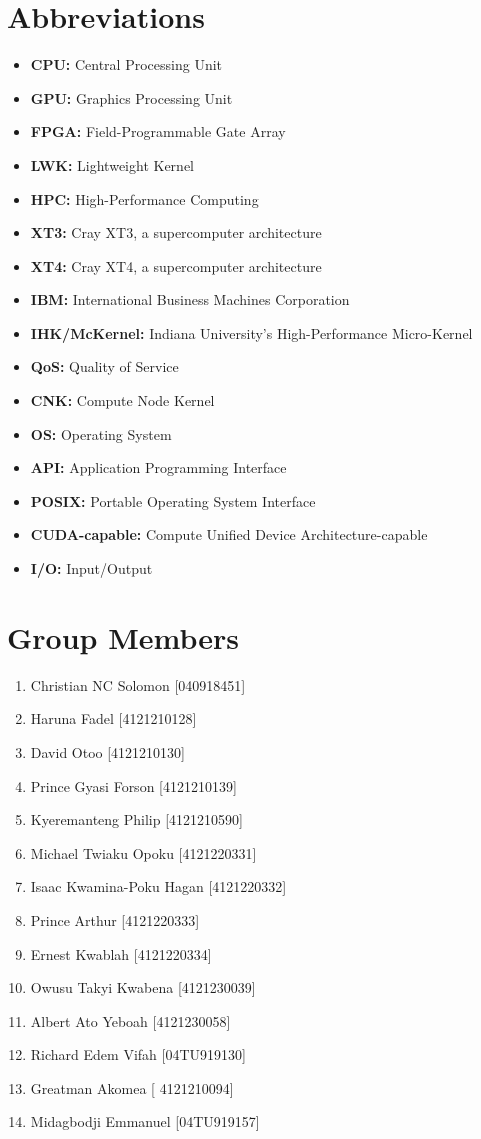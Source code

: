 \documentclass[16pt,a4paper]{article}
\begin{document}
\section*{Abbreviations}
\begin{itemize}
\item \textbf{CPU: } Central Processing Unit
\item \textbf{GPU: } Graphics Processing Unit
\item \textbf{FPGA: } Field-Programmable Gate Array
\item \textbf{LWK: } Lightweight Kernel
\item \textbf{HPC: } High-Performance Computing
\item \textbf{XT3: } Cray XT3, a supercomputer architecture
\item \textbf{XT4: } Cray XT4, a supercomputer architecture
\item \textbf{IBM: } International Business Machines Corporation
\item \textbf{IHK/McKernel: } Indiana University's High-Performance Micro-Kernel
\item \textbf{QoS: } Quality of Service
\item \textbf{CNK: } Compute Node Kernel
\item \textbf{OS: } Operating System
\item \textbf{API: } Application Programming Interface
\item \textbf{POSIX: } Portable Operating System Interface
\item \textbf{CUDA-capable: } Compute Unified Device Architecture-capable
\item \textbf{I/O: } Input/Output
\end{itemize}
\clearpage
\section*{Group Members}
\begin{enumerate}
\item Christian NC Solomon	[040918451]
\item Haruna Fadel [4121210128]
\item David Otoo [4121210130]
\item Prince Gyasi Forson [4121210139]
\item Kyeremanteng Philip [4121210590]
\item Michael Twiaku Opoku	[4121220331]
\item Isaac Kwamina-Poku Hagan	[4121220332]
\item Prince Arthur [4121220333]
\item Ernest Kwablah [4121220334]
\item Owusu Takyi Kwabena [4121230039]
\item Albert Ato Yeboah [4121230058]
\item Richard Edem Vifah [04TU919130]
\item Greatman Akomea [ 4121210094]
\item Midagbodji Emmanuel	 [04TU919157]
\end{enumerate}
\clearpage
\end{document}
